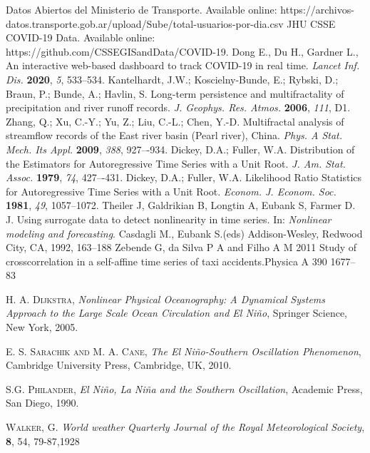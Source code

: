 \documentclass[onecolumn, preprint,aps,amsmath, amssymb, superscriptaddress]{revtex4}
\begin{document}
\begin{thebibliography}{99}
Datos Abiertos del Ministerio de Transporte. Available online: https://archivos-datos.transporte.gob.ar/upload/Sube/total-usuarios-por-dia.csv
JHU CSSE COVID-19 Data. Available online: https://github.com/CSSEGISandData/COVID-19.
Dong E., Du H., Gardner L., An interactive web-based dashboard to track COVID-19 in real time. {\em Lancet Inf. Dis.} {\bf 2020}, {\em 5}, 533--534.
Kantelhardt, J.W.; Koscielny-Bunde, E.; Rybski, D.; Braun, P.; Bunde, A.; Havlin, S. Long-term persistence and multifractality of precipitation and river runoff records. {\em J. Geophys. Res. Atmos.} {\bf 2006}, {\em 111}, D1. 
Zhang, Q.; Xu, C.-Y.; Yu, Z.; Liu, C.-L.; Chen, Y.-D. Multifractal analysis of streamflow records of the East river basin (Pearl river), China. {\em Phys. A Stat. Mech. Its Appl.} {\bf 2009}, {\em 388}, 927–-934.
Dickey, D.A.; Fuller, W.A. Distribution of the Estimators for Autoregressive Time Series with a Unit Root. {\em J. Am. Stat. Assoc.} {\bf 1979}, {\em 74}, 427–-431.
Dickey, D.A.; Fuller, W.A. Likelihood Ratio Statistics for Autoregressive Time Series with a Unit Root. {\em Econom. J. Econom. Soc.} {\bf 1981}, {\em 49}, 1057–1072.
Theiler J, Galdrikian B, Longtin A, Eubank S, Farmer D. J. Using surrogate data to detect nonlinearity in time series. In: {\em Nonlinear modeling and forecasting}. Casdagli M., Eubank S.(eds) Addison-Wesley, Redwood City, CA, 1992, 163--188
Zebende G, da Silva P A and Filho A M 2011 Study of crosscorrelation
in a self-affine time series of taxi accidents.Physica A 390 1677–83

 \textsc{H. A. Dijkstra},
\textit{Nonlinear Physical Oceanography: A Dynamical
Systems Approach to the Large Scale Ocean Circulation and
El Ni\~no}, Springer Science, New York, 2005.

 \textsc{E. S. Sarachik and M. A. Cane},
\textit{The El Ni\~no-Southern Oscillation
Phenomenon}, Cambridge University Press, Cambridge, UK, 2010.

 \textsc{S.G. Philander},
\textit{El Ni\~no, La Ni\~na and the Southern Oscillation},
 Academic Press, San Diego, 1990.
 
 \textsc{Walker, G.}
\textit{World weather}
\textit{Quarterly Journal of the Royal Meteorological Society}, \textbf{8}, 54, 79-87,1928


\end{thebibliography}
\end{document}
